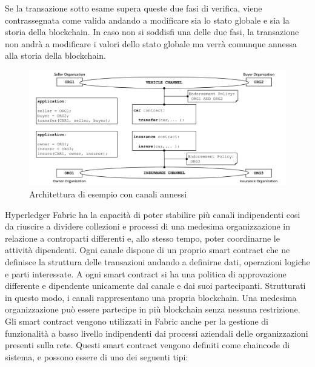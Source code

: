 Se la transazione sotto esame supera queste due fasi di verifica, viene contrassegnata come valida andando a modificare sia lo stato globale e sia la storia della blockchain. In caso non si soddisfi una delle due fasi, la transazione non andrà a modificare i valori dello stato globale ma verrà comunque annessa alla storia della blockchain.
\begin{figure}[h]
    \centering
    \includegraphics[width=1\textwidth]{img/channel-transaction.png}
    \caption{Architettura di esempio con canali annessi}
    \label{fig:channel-transaction}
\end{figure}
Hyperledger Fabric ha la capacità di poter stabilire più canali indipendenti cosi da riuscire a dividere collezioni e processi di una medesima organizzazione in relazione a controparti differenti e, allo stesso tempo, poter coordinarne le attività dipendenti. Ogni canale dispone di un proprio smart contract che ne definisce la struttura delle transazioni andando a definirne dati, operazioni logiche e parti interessate. A ogni smart contract si ha una politica di approvazione differente e dipendente unicamente dal canale e dai suoi partecipanti. Strutturati in questo modo, i canali rappresentano una propria blockchain. Una medesima organizzazione può essere partecipe in più blockchain senza nessuna restrizione. 
Gli smart contract vengono utilizzati in Fabric anche per la gestione di funzionalità a basso livello indipendenti dai processi aziendali delle organizzazioni presenti sulla rete.
Questi smart contract vengono definiti come chaincode di sistema, e possono essere di uno dei seguenti tipi:
